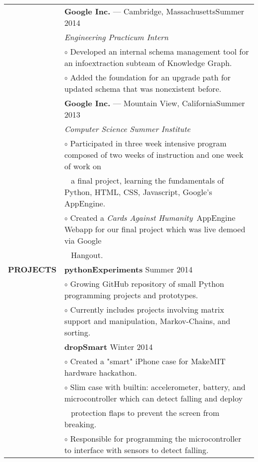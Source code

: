 \documentclass[11pt,letterpaper]{article}
\begin{document}
\begin{tabular}{@{}lp{6.6in}}
&\textbf{Google Inc.} --- Cambridge, Massachusetts\hfill Summer 2014\\
&\emph{Engineering Practicum Intern}\\
&\hspace{10pt}$\circ$ Developed an internal schema management tool for an infoextraction subteam of Knowledge Graph. \\ 
&\hspace{10pt}$\circ$ Added the foundation for an upgrade path for updated schema that was nonexistent before.\\

&\textbf{Google Inc.} --- Mountain View, California\hfill Summer 2013\\
&\emph{Computer Science Summer Institute}\\
&\hspace{10pt}$\circ$ Participated in three week intensive program composed of two weeks of instruction and one week of work on\\ &\ \hspace{3ex} a final project, learning the fundamentals of Python, HTML, CSS, Javascript, Google's AppEngine.\\
&\hspace{10pt}$\circ$ Created a \emph{Cards Against Humanity}\ AppEngine Webapp for our final project which was live demoed via Google \\ 
&\ \hspace{3ex} Hangout.\\

\textbf{PROJECTS}

&\textbf{pythonExperiments} \hfill Summer 2014\\
&\hspace{10pt}$\circ$ Growing GitHub repository of small Python programming projects and prototypes.\\ 
&\hspace{10pt}$\circ$ Currently includes projects involving matrix support and manipulation, Markov-Chains, and sorting.\\

&\textbf{dropSmart} \hfill Winter 2014\\
&\hspace{10pt}$\circ$ Created a "smart" iPhone case for MakeMIT hardware hackathon.\\ 
&\hspace{10pt}$\circ$ Slim case with builtin: accelerometer, battery, and microcontroller which can detect falling and deploy\\
&\ \hspace{3ex} protection flaps to prevent the screen from breaking.\\
&\hspace{10pt}$\circ$ Responsible for programming the microcontroller to interface with sensors to detect falling.\\


\end{tabular}
\end{document}

